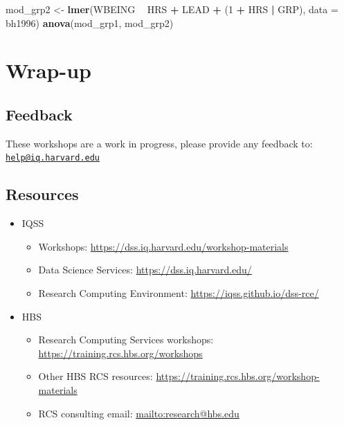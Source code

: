 \documentclass[]{book}
\newenvironment{Shaded}{\begin{snugshade}}{\end{snugshade}}
\newcommand{\KeywordTok}[1]{\textcolor[rgb]{0.13,0.29,0.53}{\textbf{#1}}}
\newcommand{\DataTypeTok}[1]{\textcolor[rgb]{0.13,0.29,0.53}{#1}}
\newcommand{\DecValTok}[1]{\textcolor[rgb]{0.00,0.00,0.81}{#1}}
\newcommand{\StringTok}[1]{\textcolor[rgb]{0.31,0.60,0.02}{#1}}
\newcommand{\OperatorTok}[1]{\textcolor[rgb]{0.81,0.36,0.00}{\textbf{#1}}}
\newcommand{\NormalTok}[1]{#1}
\providecommand{\tightlist}{%
  \setlength{\itemsep}{0pt}\setlength{\parskip}{0pt}}
\begin{document}
\begin{Shaded}
\begin{Highlighting}[]
\NormalTok{  mod_grp2 <-}\StringTok{ }\KeywordTok{lmer}\NormalTok{(WBEING }\OperatorTok{~}\StringTok{ }\NormalTok{HRS }\OperatorTok{+}\StringTok{ }\NormalTok{LEAD }\OperatorTok{+}\StringTok{ }\NormalTok{(}\DecValTok{1} \OperatorTok{+}\StringTok{ }\NormalTok{HRS }\OperatorTok{|}\StringTok{ }\NormalTok{GRP), }\DataTypeTok{data =}\NormalTok{ bh1996)}
  \KeywordTok{anova}\NormalTok{(mod_grp1, mod_grp2)}
\end{Highlighting}
\end{Shaded}

\section{Wrap-up}\label{wrap-up-2}

\subsection{Feedback}\label{feedback-2}

These workshops are a work in progress, please provide any feedback to:
\href{mailto:help@iq.harvard.edu}{\nolinkurl{help@iq.harvard.edu}}

\subsection{Resources}\label{resources-2}

\begin{itemize}
\tightlist
\item
  IQSS

  \begin{itemize}
  \tightlist
  \item
    Workshops: \url{https://dss.iq.harvard.edu/workshop-materials}
  \item
    Data Science Services: \url{https://dss.iq.harvard.edu/}
  \item
    Research Computing Environment:
    \url{https://iqss.github.io/dss-rce/}
  \end{itemize}
\item
  HBS

  \begin{itemize}
  \tightlist
  \item
    Research Computing Services workshops:
    \url{https://training.rcs.hbs.org/workshops}
  \item
    Other HBS RCS resources:
    \url{https://training.rcs.hbs.org/workshop-materials}
  \item
    RCS consulting email: \url{mailto:research@hbs.edu}
  \end{itemize}
\end{itemize}
\end{document}
